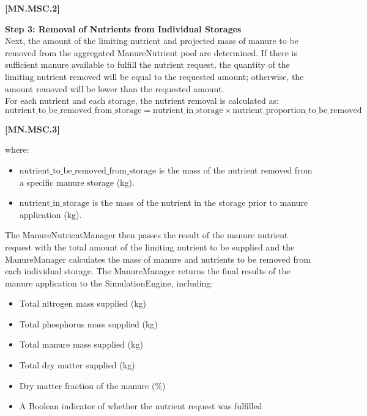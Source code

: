 \begin{refsection}
    {\raggedleft \textbf{[MN.MSC.2]}\par}

\vspace{0.2cm}
\textbf{Step 3: Removal of Nutrients from Individual Storages}
\\
Next, the amount of the limiting nutrient and projected mass of manure to be removed from the aggregated ManureNutrient pool are determined. If there is sufficient manure available to fulfill the nutrient request, the quantity of the limiting nutrient removed will be equal to the requested amount; otherwise, the amount removed will be lower than the requested amount.
\\
For each nutrient and each storage, the nutrient removal is calculated as:
\begin{equation}
\text{nutrient\_to\_be\_removed\_from\_storage} =
\text{nutrient\_in\_storage} \times \text{nutrient\_proportion\_to\_be\_removed}
\end{equation}
\vspace{0.5cm} 
    
    {\raggedleft \textbf{[MN.MSC.3]}\par}
    \vspace{0.5cm}

where:
\begin{itemize}
\item $\text{nutrient\_to\_be\_removed\_from\_storage}$ is the mass of the nutrient removed from a specific manure storage (kg).
\item $\text{nutrient\_in\_storage}$ is the mass of the nutrient in the storage prior to manure application (kg).
\end{itemize}

The ManureNutrientManager then passes the result of the manure nutrient request with the total amount of the limiting nutrient to be supplied and the ManureManager calculates the mass of manure and nutrients to be removed from each individual storage. The ManureManager returns the final results of the manure application to the SimulationEngine, including:
\begin{itemize}
\item Total nitrogen mass supplied (kg)
\item Total phosphorus mass supplied (kg)
\item Total manure mass supplied (kg)
\item Total dry matter supplied (kg)
\item Dry matter fraction of the manure (\%)
\item A Boolean indicator of whether the nutrient request was fulfilled
\end{itemize}


\end{refsection}
